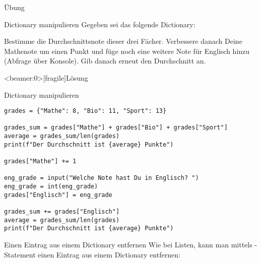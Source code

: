 \begin{frame}{Übung}

\begin{block}{Dictionary manipulieren}
	\vspace{2pt}
	Gegeben sei das folgende Dictionary: 
	
	
	Bestimme die Durchschnittsnote dieser drei Fächer. Verbessere danach Deine Mathenote um einen Punkt und füge noch eine weitere Note für Englisch hinzu (Abfrage über Konsole). Gib danach erneut den Durchschnitt an.  
\end{block}

\end{frame}


\begin{frame}<beamer:0>[fragile]{Lösung}

\begin{solutionblock}{Dictionary manipulieren}
\begin{verbatim}
grades = {"Mathe": 8, "Bio": 11, "Sport": 13}

grades_sum = grades["Mathe"] + grades["Bio"] + grades["Sport"]
average = grades_sum/len(grades)
print(f"Der Durchschnitt ist {average} Punkte")

grades["Mathe"] += 1

eng_grade = input("Welche Note hast Du in Englisch? ")
eng_grade = int(eng_grade)
grades["Englisch"] = eng_grade

grades_sum += grades["Englisch"]
average = grades_sum/len(grades)
print(f"Der Durchschnitt ist {average} Punkte")
\end{verbatim}
\end{solutionblock}
\end{frame}



\begin{frame}
\begin{block}{Einen Eintrag aus einem Dictionary entfernen}
\vspace{2pt}
Wie bei Listen, kann man mittels -Statement einen Eintrag aus einem Dictionary entfernen: 


\end{block}	



\end{frame}	

